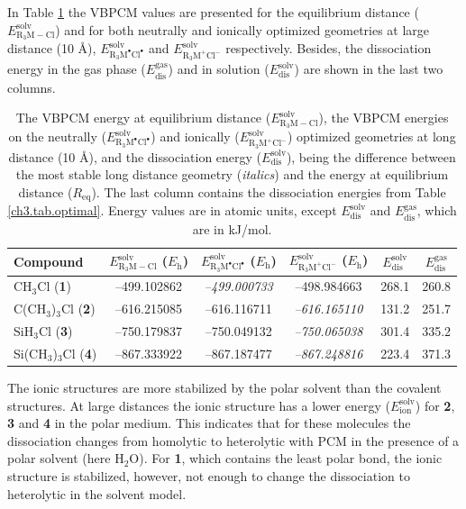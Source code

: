 In Table \ref{ch3.tab.solution} the VBPCM values are presented for the equilibrium distance ($E_\mathrm{R_{3}M-Cl}^\mathrm{solv}$) and for both neutrally and ionically optimized geometries at large distance (10 \AA), $E_\mathrm{R_{3}M^\bullet Cl^\bullet}^\mathrm{solv}$ and $E_\mathrm{R_{3}M^{+} Cl^{-}}^\mathrm{solv}$ respectively. Besides, the dissociation energy in the gas phase ($E_\mathrm{dis}^\mathrm{gas}$) and in solution ($E_\mathrm{dis}^\mathrm{solv}$) are shown in the last two columns.
\begin{table}[htp]
\center
\caption{The VBPCM energy at equilibrium distance ($E_\mathrm{R_{3}M-Cl}^\mathrm{solv}$), the VBPCM energies on the neutrally ($E_\mathrm{R_{3}M^\bullet Cl^\bullet}^\mathrm{solv}$) and ionically ($E_\mathrm{R_{3}M^{+} Cl^{-}}^\mathrm{solv}$) optimized geometries at long distance (10 \AA), and the dissociation energy ($E_\mathrm{dis}^\mathrm{solv}$), being the difference between the most stable long distance geometry (\textit{italics}) and the energy at equilibrium distance ($R_\mathrm{eq}$). The last column contains the dissociation energies from Table \ref{ch3.tab.optimal}. Energy values are in atomic units, except $E_\mathrm{dis}^\mathrm{solv}$ and $E_\mathrm{dis}^\mathrm{gas}$, which are in kJ/mol.}
\begin{tabular}{|l|c|c|c|c|c|}
\hline
\textbf{Compound} & $E_\mathrm{R_{3}M-Cl}^\mathrm{solv}$ ($E_{\mathrm{h}}$) & $E_\mathrm{R_{3}M^\bullet Cl^\bullet}^\mathrm{solv}$ ($E_{\mathrm{h}}$) & $E_\mathrm{R_{3}M^{+} Cl^{-}}^\mathrm{solv}$ ($E_{\mathrm{h}}$) & $E_\mathrm{dis}^\mathrm{solv}$&
$E_\mathrm{dis}^\mathrm{gas}$\\
\hline
CH$_3$Cl (\textbf{1})& --499.102862 & \textit{--499.000733} & --498.984663 & 268.1 & 260.8 \\
C(CH$_3$)$_3$Cl (\textbf{2})& --616.215085 & --616.116711 & \textit{--616.165110} & 131.2 & 251.7 \\
SiH$_3$Cl (\textbf{3})& --750.179837 & --750.049132 & \textit{--750.065038} &  301.4 & 335.2 \\
Si(CH$_3$)$_3$Cl (\textbf{4})& --867.333922 & --867.187477 & \textit{--867.248816} & 223.4 & 371.3 \\
\hline
\end{tabular}
\label{ch3.tab.solution}
\end{table} 

The ionic structures are more stabilized by the polar solvent than the covalent structures. At large distances the ionic structure has a lower energy ($E_\mathrm{ion}^\mathrm{solv}$) for \textbf{2}, \textbf{3} and \textbf{4} in the polar medium. This indicates that for these molecules the dissociation changes from homolytic to heterolytic with PCM in the presence of a polar solvent (here H$_2$O). For \textbf{1}, which contains the least polar bond, the ionic structure is stabilized, however, not enough to change the dissociation to heterolytic in the solvent model.


